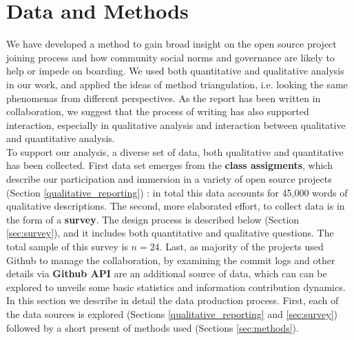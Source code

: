 \section{Data and Methods}

We have developed a method to gain broad insight on the open source project joining process and how community social norms and governance are likely to help or impede on boarding. We used both quantitative and qualitative analysis in our work, and applied the ideas of method triangulation, i.e. looking the same phenomenas from different perspectives. As the report has been written in collaboration, we suggest that the process of writing has also supported interaction, especially in qualitative analysis and interaction between qualitative and quantitative analysis.\\

\noindent To support our analysis, a diverse set of data, both qualitative and quantitative has been collected. First data set emerges from the \textbf{class assigments}, which describe our participation and immersion in a variety of open source projects (Section \ref{qualitative_reporting}) : in total this data accounts for 45,000 words of qualitative descriptions. The second, more elaborated effort, to collect data is in the form of a \textbf{survey}. The design process is described below (Section \ref{sec:survey}), and it includes both quantitative and qualitative questions. The total sample of this survey is $n=24$. Last, as majority of the projects used Github to manage the collaboration, by examining the commit logs and other details via \textbf{Github API} are an additional source of data, which can can be explored to unveils some basic statistics and information contribution dynamics.\\


\noindent In this section we describe in detail the data production process. First, each of the data sources is explored (Sections \ref{qualitative_reporting} and  \ref{sec:survey}) followed by a short present of methods used (Sections \ref{sec:methods}).

